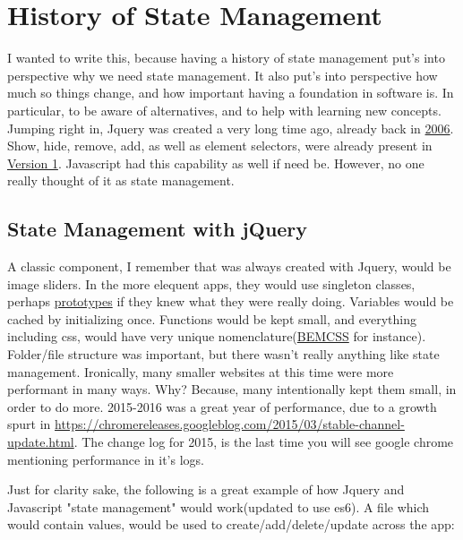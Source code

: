 \maketitle{}
\section{ History of State Management }

I wanted to write this, because having a history of state management put's into
perspective why we need state management. It also put's into perspective how
much so things change, and how important having a foundation in software is.
In particular, to be aware of alternatives, and to help with learning new
concepts. Jumping right in, Jquery was created a very long time ago, already
back in \href{https://en.wikipedia.org/wiki/JQuery}{2006}. Show, hide, remove,
add, as well as element selectors, were already present in
\href{http://api.jquery.com/category/version/1.0/}{Version 1}. Javascript had
this capability as well if need be. However, no one really thought of it as
state management.

\subsection{ State Management with jQuery }
A classic component, I remember that was always created with Jquery, would be
image sliders. In the more elequent apps, they would use singleton classes,
perhaps \href{https://www.w3schools.com/js/js\_object\_prototypes.asp}{prototypes}
if they knew what they were really doing. Variables would be cached by
initializing once. Functions would be kept small, and everything including css,
would have very unique nomenclature(\href{http://getbem.com/introduction/}{BEMCSS}
for instance). Folder/file structure was important, but there wasn't really
anything like state management. Ironically, many smaller websites at this time
were more performant in many ways. Why? Because, many intentionally kept them
small, in order to do more. 2015-2016 was a great year of performance, due to a
growth spurt in \href{browser capabilities}{https://chromereleases.googleblog.com/2015/03/stable-channel-update.html}.
The change log for 2015, is the last time you will see google chrome mentioning
performance in it's logs.

Just for clarity sake, the following is a great example of how Jquery and
Javascript "state management" would work(updated to use es6). A file which would
contain values, would be used to create/add/delete/update across the app:

